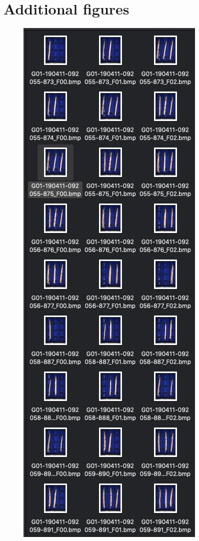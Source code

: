 
\section{Additional figures}
\label{apx:AdditionalFigures}

\begin{figure}[h]
	\centering
	\includegraphics[scale=0.4]{Figures/appendix/original_files_naming_conventions.png}

\end{figure}
